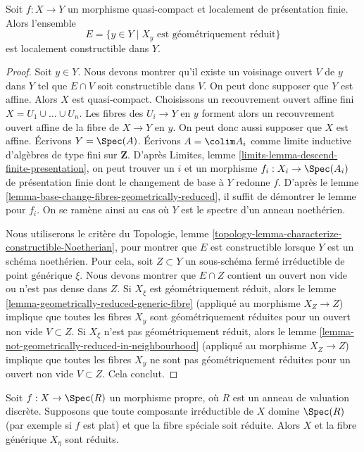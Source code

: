 \begin{lemma}
\label{lemma-geometrically-reduced-constructible}
Soit $f : X \to Y$ un morphisme quasi-compact et
localement de présentation finie. Alors l'ensemble
$$
E = \{y \in Y \mid X_y\text{ est géométriquement réduit}\}
$$
est localement constructible dans $Y$.
\end{lemma}

\begin{proof}
Soit $y \in Y$. Nous devons montrer qu'il existe un voisinage ouvert
$V$ de $y$ dans $Y$ tel que $E \cap V$ soit constructible dans $V$. On peut donc
supposer que $Y$ est affine. Alors $X$ est quasi-compact.
Choisissons un recouvrement ouvert affine fini $X = U_1 \cup \ldots \cup U_n$.
Les fibres des $U_i \to Y$ en $y$ forment alors un recouvrement ouvert affine
de la fibre de $X \to Y$ en $y$. On peut donc aussi supposer que $X$ est affine.
Écrivons $Y = \Spec(A)$.
Écrivons $A = \colim A_i$ comme limite inductive d'algèbres
de type fini sur $\mathbf{Z}$. D'après
Limites, lemme \ref{limits-lemma-descend-finite-presentation},
on peut trouver un $i$ et un morphisme $f_i : X_i \to \Spec(A_i)$ de
présentation finie dont le changement de base à $Y$ redonne $f$. D'après le
lemme \ref{lemma-base-change-fibres-geometrically-reduced},
il suffit de démontrer le lemme pour $f_i$. On se ramène ainsi au
cas où $Y$ est le spectre d'un anneau noethérien.

\medskip\noindent
Nous utiliserons le critère du
Topologie, lemme \ref{topology-lemma-characterize-constructible-Noetherian},
pour montrer que $E$ est constructible lorsque $Y$ est un schéma noethérien.
Pour cela, soit $Z \subset Y$ un sous-schéma fermé irréductible
de point générique $\xi$.
Nous devons montrer que $E \cap Z$ contient un ouvert non vide
ou n'est pas dense dans $Z$. Si $X_\xi$ est géométriquement réduit, alors le
lemme \ref{lemma-geometrically-reduced-generic-fibre}
(appliqué au morphisme $X_Z \to Z$)
implique que toutes les fibres $X_y$ sont géométriquement réduites
pour un ouvert non vide $V \subset Z$.
Si $X_\xi$ n'est pas géométriquement réduit, alors le
lemme \ref{lemma-not-geometrically-reduced-in-neighbourhood}
(appliqué au morphisme $X_Z \to Z$)
implique que toutes les fibres $X_y$ ne sont pas géométriquement réduites
pour un ouvert non vide $V \subset Z$. Cela conclut.
\end{proof}

\begin{lemma}
\label{lemma-proper-flat-over-dvr-reduced-fibre}
Soit $f : X \to \Spec(R)$ un morphisme propre, où $R$ est un
anneau de valuation discrète. Supposons que toute composante irréductible
de $X$ domine $\Spec(R)$ (par exemple si $f$ est plat) et
que la fibre spéciale soit réduite. Alors
$X$ et la fibre générique $X_\eta$ sont réduits.
\end{lemma}

